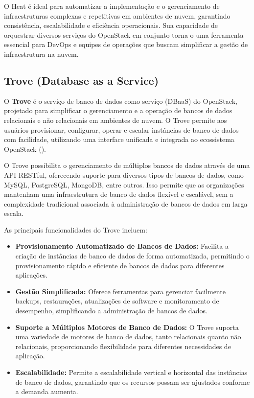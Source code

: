 O Heat é ideal para automatizar a implementação e o gerenciamento de infraestruturas complexas e repetitivas em ambientes de nuvem, garantindo consistência, escalabilidade e eficiência operacionais. Sua capacidade de orquestrar diversos serviços do OpenStack em conjunto torna-o uma ferramenta essencial para DevOps e equipes de operações que buscam simplificar a gestão de infraestrutura na nuvem.


\subsection{Trove (Database as a Service)}

O \textbf{Trove} é o serviço de banco de dados como serviço (DBaaS) do OpenStack, projetado para simplificar o gerenciamento e a operação de bancos de dados relacionais e não relacionais em ambientes de nuvem. O Trove permite aos usuários provisionar, configurar, operar e escalar instâncias de banco de dados com facilidade, utilizando uma interface unificada e integrada ao ecossistema OpenStack (\cite{OpenStackTrove}).

O Trove possibilita o gerenciamento de múltiplos bancos de dados através de uma API RESTful, oferecendo suporte para diversos tipos de bancos de dados, como MySQL, PostgreSQL, MongoDB, entre outros. Isso permite que as organizações mantenham uma infraestrutura de banco de dados flexível e escalável, sem a complexidade tradicional associada à administração de bancos de dados em larga escala.

As principais funcionalidades do Trove incluem:

\begin{itemize}
    \item \textbf{Provisionamento Automatizado de Bancos de Dados:} Facilita a criação de instâncias de banco de dados de forma automatizada, permitindo o provisionamento rápido e eficiente de bancos de dados para diferentes aplicações.
    \item \textbf{Gestão Simplificada:} Oferece ferramentas para gerenciar facilmente backups, restaurações, atualizações de software e monitoramento de desempenho, simplificando a administração de bancos de dados.
    \item \textbf{Suporte a Múltiplos Motores de Banco de Dados:} O Trove suporta uma variedade de motores de banco de dados, tanto relacionais quanto não relacionais, proporcionando flexibilidade para diferentes necessidades de aplicação.
    \item \textbf{Escalabilidade:} Permite a escalabilidade vertical e horizontal das instâncias de banco de dados, garantindo que os recursos possam ser ajustados conforme a demanda aumenta.
\end{itemize}


